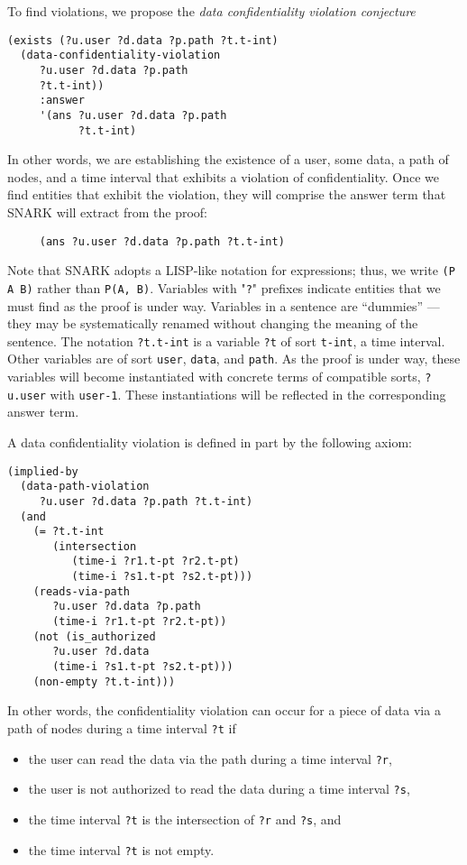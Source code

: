To find violations, we propose the \textit{data confidentiality violation conjecture}
\begin{verbatim}
(exists (?u.user ?d.data ?p.path ?t.t-int)
  (data-confidentiality-violation 
     ?u.user ?d.data ?p.path 
     ?t.t-int))
     :answer
     '(ans ?u.user ?d.data ?p.path 
           ?t.t-int)
\end{verbatim}

In other words, we are establishing the existence of  a user, some data, a path of nodes, and a time interval that exhibits a violation of confidentiality. 
Once we find entities that exhibit the violation, they will comprise the answer term that SNARK will extract from the proof:  
  \begin{verbatim}
     (ans ?u.user ?d.data ?p.path ?t.t-int)
  \end{verbatim}

Note that SNARK adopts a LISP-like notation for expressions; thus, we write \verb'(P A B)' rather than \verb'P(A, B)'. 
Variables with "\verb'?'" prefixes indicate entities that we must find as the proof is under way.
Variables in a sentence are ``dummies'' \---- they may be systematically renamed without changing the meaning of the sentence. 
The notation \verb'?t.t-int' is a variable \verb'?t' of sort \verb't-int', \ie a time interval. 
Other variables are of sort \verb'user', \verb'data', and \verb'path'.
As the proof is under way, these variables will become instantiated with concrete terms of compatible sorts, \eg \verb'?u.user' with \verb'user-1'. 
These instantiations will be reflected in the corresponding answer term.

A data confidentiality violation is defined in part by the following axiom:   
\begin{verbatim}                                             
(implied-by
  (data-path-violation 
     ?u.user ?d.data ?p.path ?t.t-int)
  (and
    (= ?t.t-int
       (intersection
    	  (time-i ?r1.t-pt ?r2.t-pt)
    	  (time-i ?s1.t-pt ?s2.t-pt)))
    (reads-via-path
       ?u.user ?d.data ?p.path 
       (time-i ?r1.t-pt ?r2.t-pt))
    (not (is_authorized
       ?u.user ?d.data
       (time-i ?s1.t-pt ?s2.t-pt)))
    (non-empty ?t.t-int)))
\end{verbatim}

In other words, the confidentiality violation can occur for a piece of data via a path of nodes during a time interval \verb'?t' if
\begin{itemize}
\item the user can read the data via the path during a time interval \verb'?r',
\item the user is not authorized to read the data during a time interval \verb'?s',
\item the time interval \verb'?t' is the intersection of \verb'?r' and \verb'?s', and
\item the time interval \verb'?t' is not empty.
\end{itemize}


